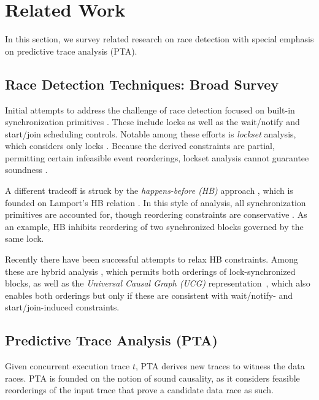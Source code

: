 \section{Related Work}

In this section, we survey related research on race detection with special emphasis on predictive trace analysis (PTA).

\subsection{Race Detection Techniques: Broad Survey} 

Initial attempts to address the challenge of race detection focused on built-in synchronization primitives \cite{eraser,SasturkarAWS05,vonPraun:2001,Choi:2002}. These include locks as well as the wait/notify and start/join scheduling controls. Notable among these efforts is \emph{lockset} analysis, which considers only locks \cite{eraser}. Because the derived constraints are partial, permitting certain infeasible event reorderings, lockset analysis cannot guarantee soundness \cite{Naik:2006}. 

A different tradeoff is struck by the \emph{happens-before (HB)} approach \cite{Christiaens,Dinning:1990,Mellor-Crummey:1991}, which is founded on Lamport's HB relation \cite{Lamport}. In this style of analysis, all synchronization primitives are accounted for, though reordering constraints are conservative . As an example, HB inhibits reordering of two synchronized blocks governed by the same lock. 


Recently there have been successful attempts to relax HB constraints. Among these are hybrid analysis \cite{hybrid}, which permits both orderings of lock-synchronized blocks, as well as the \emph{Universal Causal Graph (UCG)} representation~\cite{ucg}, which also enables both orderings but only if these are consistent with wait/notify- and start/join-induced constraints.

\subsection{Predictive Trace Analysis (PTA)}

Given concurrent execution trace $t$, PTA derives new traces to witness the data races. PTA is founded on the notion of sound causality, as it considers feasible reorderings of the input trace that prove a candidate data race as such. 



